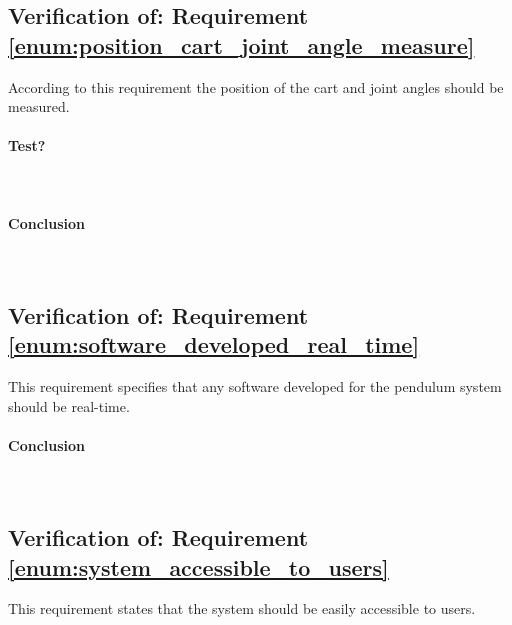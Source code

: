 \subsection{Verification of: Requirement \ref{enum:position_cart_joint_angle_measure}} %
\label{sub:verification_of_requirement_enum:position_cart_joint_angle_measure}
According to this requirement the position of the cart and joint angles should be measured.

\paragraph{Test?}~\\

\paragraph{Conclusion}~\\

\begin{figure}[h]
	\centering
	\caption{}
	\label{fig:joint_angle_measured_full}
\end{figure}


\begin{figure}[h]
	\centering
	\caption{}
	\label{fig:joint_angle_measured_zoom}
\end{figure}


\subsection{Verification of: Requirement \ref{enum:software_developed_real_time}} %
\label{sub:verification_of_requirement_enum:software_developed_real_time}
This requirement specifies that any software developed for the pendulum system should be real-time.

\paragraph{Conclusion}~\\


\subsection{Verification of: Requirement \ref{enum:system_accessible_to_users}} %
\label{sub:verification_of_requirement_enum:system_accessible_to_users}
This requirement states that the system should be easily accessible to users.

